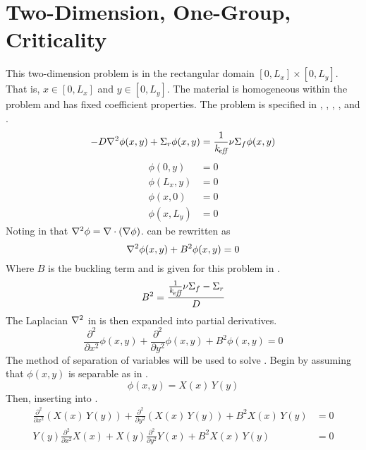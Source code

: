 \section{Two-Dimension, One-Group, Criticality}
  \label{sec:deriv_2d1g}
  This two-dimension problem is in the rectangular domain $[0,L_x] \times
  [0,L_y]$. That is, $x \in [0,L_x]$ and $y \in [0,L_y]$. The material is
  homogeneous within the problem and has fixed coefficient properties. The
  problem is specified in , ,
  , , and .
  \begin{equation}
    \label{eq:2d1g}
    -D \mathbf{\nabla}^2 \phi(x,y) + \Sigma_r \phi(x,y) = 
      \frac{1}{k_{\!\mbox{\scriptsize \em eff}}} \nu \Sigma_f \phi(x,y)
  \end{equation}
  \begin{align}
    \label{eq:2d1g_bc1}
    \phi(0,y) &= 0 \\
    \label{eq:2d1g_bc2}
    \phi(L_x,y) &= 0 \\
    \label{eq:2d1g_bc3}
    \phi(x,0) &= 0 \\
    \label{eq:2d1g_bc4}
    \phi(x,L_y) &= 0
  \end{align}
  Noting in  that $\mathbf{\nabla}^2 \phi = \mathbf{\nabla} \cdot (\mathbf{\nabla} \phi)$.
   can be rewritten as
  \begin{equation}
    \label{eq:2d1g_buckle}
    \mathbf{\nabla}^2 \phi(x,y) + B^2 \phi(x,y) = 0
  \end{equation}
  Where $B$ is the buckling term and is given for this problem in
  .
  \begin{equation}
    \label{eq:2d1g_b2}
    B^2 = \frac{\frac{1}{k_{\!\mbox{\scriptsize \em eff}}} \nu \Sigma_f - \Sigma_r}{D}
  \end{equation}
  The Laplacian $\mathbf{\nabla}^2$ in  is then expanded into partial
  derivatives.
  \begin{equation}
    \label{eq:2d1g_partial}
    \frac{\partial^2}{\partial x^2} \phi(x,y) + \frac{\partial^2}{\partial y^2}
      \phi(x,y) + B^2 \phi(x,y) = 0
  \end{equation}
  The method of separation of variables will be used to solve
  . Begin by assuming that $\phi(x,y)$ is separable as in
  .
  \begin{equation}
    \label{eq:2d1g_separable}
    \phi(x,y) = X(x)\,Y(y)
  \end{equation}
  Then, inserting  into .
  \begin{align}
    \frac{\partial^2}{\partial x^2} \left( X(x)\,Y(y) \right) + 
      \frac{\partial^2}{\partial y^2} \left( X(x)\,Y(y) \right) + 
      B^2 X(x)\,Y(y) &= 0 \\
    \label{eq:2d1g_above}
    Y(y) \frac{\partial^2}{\partial x^2} X(x) + 
      X(y) \frac{\partial^2}{\partial y^2} Y(x) + 
      B^2 X(x) \, Y(y) &= 0
  \end{align}
